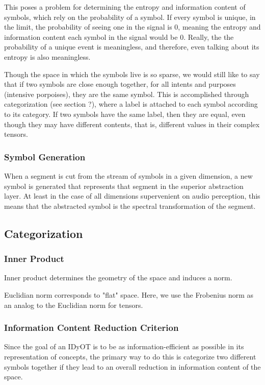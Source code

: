 \documentclass[runningheads]{llncs}
\begin{document}
This poses a problem for determining the entropy and information content of symbols, which rely on the probability of a symbol.  If every symbol is unique, in the limit, the probability of seeing one in the signal is 0, meaning the entropy and information content each symbol in the signal would be 0. Really, the the probability of a unique event is meaningless, and therefore, even talking about its entropy is also meaningless.  

Though the space in which the symbols live is so sparse, we would still like to say that if two symbols are close enough together, for all intents and purposes (intensive porpoises), they are the same symbol.  This is accomplished through categorization (see section ?), where a label is attached to each symbol according to its category.  If two symbols have the same label, then they are equal, even though they may have different contents, that is, different values in their complex tensors.

\subsubsection{Symbol Generation}
When a segment is cut from the stream of symbols in a given dimension, a new symbol is generated that represents that segment in the superior abstraction layer.  At least in the case of all dimensions supervenient on audio perception, this means that the abstracted symbol is the spectral transformation of the segment.


\subsection{Categorization}

\subsubsection{Inner Product}
Inner product determines the geometry of the space and induces a norm.

Euclidian norm corresponds to "flat" space.  Here, we use the Frobenius norm as an analog to the Euclidian norm for tensors.

\subsubsection{Information Content Reduction Criterion} 
Since the goal of an IDyOT is to be as information-efficient as possible in its representation of concepts, the primary way to do this is categorize two different symbols together if they lead to an overall reduction in information content of the space.
\end{document}
